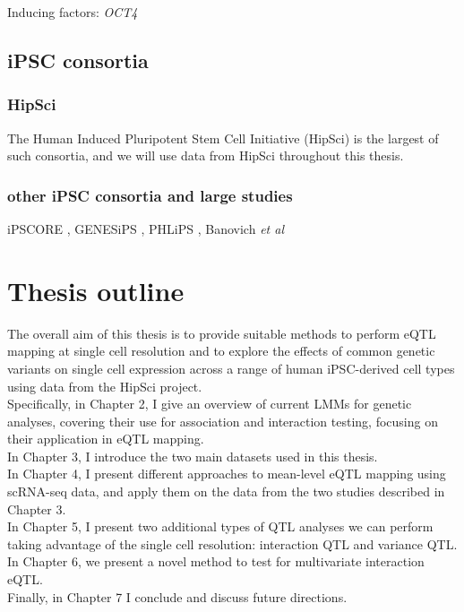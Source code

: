 Inducing factors:
\textit{OCT4}


\subsection{iPSC consortia}

\subsubsection{HipSci}
The Human Induced Pluripotent Stem Cell Initiative (HipSci) is the largest of such consortia, and we will use data from HipSci \cite{kilpinen2017common} throughout this thesis.

\subsubsection{other iPSC consortia and large studies}

iPSCORE \cite{panopoulos2017ipscore}, GENESiPS \cite{carcamo2017analysis}, PHLiPS \cite{pashos2017large}, Banovich \textit{et al} \cite{banovich2018impact}

\cite{bonder2019systematic}

\newpage

\section{Thesis outline}

The overall aim of this thesis is to provide suitable methods to perform eQTL mapping at single cell resolution and to explore the effects of common genetic variants on single cell expression across a range of human iPSC-derived cell types using data from the HipSci project.\\

Specifically, in Chapter 2, I give an overview of current LMMs for genetic analyses, covering their use for association and interaction testing, focusing on their application in eQTL mapping.\\

In Chapter 3, I introduce the two main datasets used in this thesis. \\

In Chapter 4, I present different approaches to mean-level eQTL mapping using scRNA-seq data, and apply them on the data from the two studies described in Chapter 3. \\

In Chapter 5, I present two additional types of QTL analyses we can perform taking advantage of the single cell resolution: interaction QTL and variance QTL. \\

In Chapter 6, we present a novel method to test for multivariate interaction eQTL. \\

Finally, in Chapter 7 I conclude and discuss future directions.